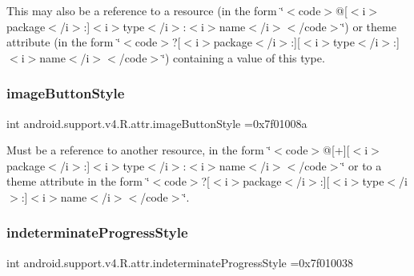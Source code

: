 This may also be a reference to a resource (in the form \char`\"{}$<$code$>$@\mbox{[}$<$i$>$package$<$/i$>$\+:\mbox{]}$<$i$>$type$<$/i$>$\+:$<$i$>$name$<$/i$>$$<$/code$>$\char`\"{}) or theme attribute (in the form \char`\"{}$<$code$>$?\mbox{[}$<$i$>$package$<$/i$>$\+:\mbox{]}\mbox{[}$<$i$>$type$<$/i$>$\+:\mbox{]}$<$i$>$name$<$/i$>$$<$/code$>$\char`\"{}) containing a value of this type. \mbox{\label{classandroid_1_1support_1_1v4_1_1R_1_1attr_af6785bda01a49bcd1c0eec8a98ad437d}} 
\subsubsection{\texorpdfstring{image\+Button\+Style}{imageButtonStyle}}
{\footnotesize\ttfamily int android.\+support.\+v4.\+R.\+attr.\+image\+Button\+Style =0x7f01008a\hspace{0.3cm}{\ttfamily [static]}}

Must be a reference to another resource, in the form \char`\"{}$<$code$>$@\mbox{[}+\mbox{]}\mbox{[}$<$i$>$package$<$/i$>$\+:\mbox{]}$<$i$>$type$<$/i$>$\+:$<$i$>$name$<$/i$>$$<$/code$>$\char`\"{} or to a theme attribute in the form \char`\"{}$<$code$>$?\mbox{[}$<$i$>$package$<$/i$>$\+:\mbox{]}\mbox{[}$<$i$>$type$<$/i$>$\+:\mbox{]}$<$i$>$name$<$/i$>$$<$/code$>$\char`\"{}. \mbox{\label{classandroid_1_1support_1_1v4_1_1R_1_1attr_af1ca710e3b6f2eed102575a6bb2797ce}} 
\subsubsection{\texorpdfstring{indeterminate\+Progress\+Style}{indeterminateProgressStyle}}
{\footnotesize\ttfamily int android.\+support.\+v4.\+R.\+attr.\+indeterminate\+Progress\+Style =0x7f010038\hspace{0.3cm}{\ttfamily [static]}}

